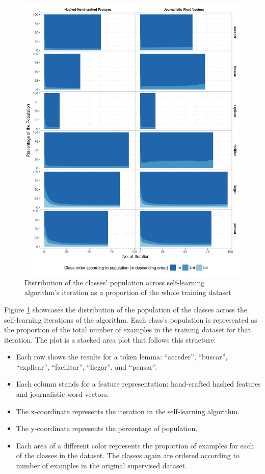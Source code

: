 \begin{figure}[htb!]
  \centering
  \includegraphics[height=.9\textheight,width=\textwidth,keepaspectratio]
    {plots/selflearning/population_distribution}
  \caption{Distribution of the classes' population across self-learning
  algorithm's iteration as a proportion of the whole training dataset}
  \label{fig:self-learning:population_distribution}
\end{figure}

Figure \ref{fig:self-learning:population_distribution} showcases the
distribution of the population of the classes across the self-learning
iterations of the algorithm. Each class's population is represented as the
proportion of the total number of examples in the training dataset for that
iteration. The plot is a stacked area plot that follows this structure:

\begin{itemize}
  \item Each row shows the results for a token lemma: ``acceder'', ``buscar'',
    ``explicar'', ``facilitar'', ``llegar'', and ``pensar''.
  \item Each column stands for a feature representation: hand-crafted hashed
    features and journalistic word vectors.
  \item The x-coordinate represents the iteration in the self-learning
    algorithm.
  \item The y-coordinate represents the percentage of population.
  \item Each area of a different color represents the proportion of examples
    for each of the classes in the dataset. The classes again are ordered
    according to number of examples in the original supervised dataset.
\end{itemize}

